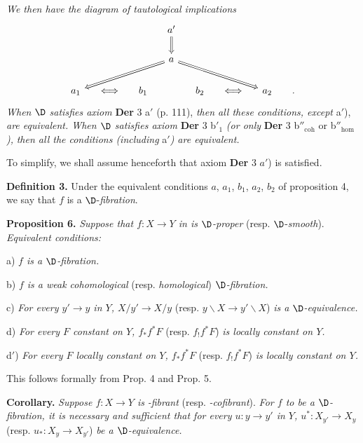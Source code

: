 \textit{We then have the diagram of tautological implications}
\[
\begin{tikzcd}[column sep=small]
& & & a' \arrow[d, Rightarrow] & & & & \\
& & & a \arrow[dlll, Rightarrow] \arrow[drrr, Rightarrow] & & & & \\
a_1 & \Longleftrightarrow & b_1 & & b_2 & \Longleftrightarrow & a_2 & .
\end{tikzcd}
\]
\textit{When $\D$ satisfies axiom} \textbf{Der} 3 a$'$ (p. 111), \textit{then all these conditions, except} a$'$), \textit{are equivalent. When $\D$ satisfies axiom} \textbf{Der} 3 b$'_1$ \textit{(or only} \textbf{Der} 3 b$''_{\mathrm{coh}}$ or b$''_{\mathrm{hom}}$\textit{),} \textit{then all the conditions (including} a$'$\textit{) are equivalent.}

To simplify, we shall assume henceforth that axiom \textbf{Der} 3 $a'$) is satisfied.

\textbf{Definition 3.} Under the equivalent conditions $a$, $a_1$, $b_1$, $a_2$, $b_2$ of proposition 4, we say that $f$ is a $\D$-\textit{fibration}. %

\textbf{Proposition 6.} \textit{Suppose that $f : X \to Y$ in \Dia{} is $\D$-proper} (resp. $\D$-\textit{smooth}). \textit{Equivalent conditions:}

a) \textit{$f$ is a $\D$-fibration.}

b) \textit{$f$ is a weak cohomological} (resp. \textit{homological}) \textit{$\D$-fibration.}

c) \textit{For every $y' \to y$ in $Y$, $X/y' \to X/y$} (resp. $y\backslash X \to y'\backslash X$) \textit{is a $\D$-equivalence.}

d) \textit{For every $F$ constant on $Y$, $f_*f^*F$} (resp. $f_!f^*F$) \textit{is locally constant on $Y$.}

d$'$) \textit{For every $F$ locally constant on $Y$, $f_*f^*F$} (resp. $f_!f^*F$) \textit{is locally constant on $Y$.}

This follows formally from Prop. 4 and Prop. 5.

\textbf{Corollary.} \textit{Suppose $f : X \to Y$ is} \Cat\textit{-fibrant} (resp. \Cat\textit{-cofibrant}). \textit{For $f$ to be a $\D$-fibration, it is necessary and sufficient that for every $u : y \to y'$ in $Y$, $u^* : X_{y'} \to X_y$} (resp. $u_* : X_y \to X_{y'}$) \textit{be a $\D$-equivalence.}

